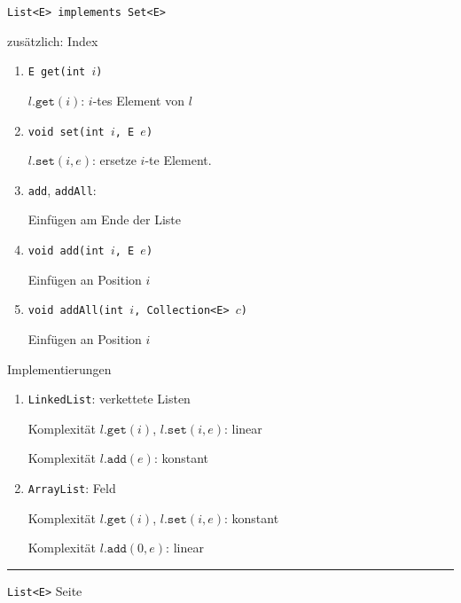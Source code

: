 \documentclass{slides}
\newcounter{mypage}
\begin{document}
\begin{slide}{}
\normalsize

\begin{center}
\texttt{List<E> implements Set<E>}
\end{center}

\footnotesize
zus\"atzlich: Index
\begin{enumerate}
\item \texttt{E get(int $i$)}

      $l.\mathtt{get}(i)$: \quad $i$-tes Element von $l$
\item \texttt{void set(int $i$, E $e$)}      

      $l.\mathtt{set}(i, e)$: \quad ersetze $i$-te Element.
\item \texttt{add}, \texttt{addAll}: 

      Einf\"ugen am Ende der Liste
\item \texttt{void add(int $i$, E $e$)}

      Einf\"ugen an Position $i$ 
\item \texttt{void addAll(int $i$, Collection<E> $c$)}

      Einf\"ugen an Position $i$ 
\end{enumerate}

Implementierungen
\begin{enumerate}
\item \texttt{LinkedList}: \quad verkettete Listen

      Komplexit\"at $l.\mathtt{get}(i)$, $l.\mathtt{set}(i,e)$: \quad linear

      Komplexit\"at $l.\mathtt{add}(e)$: \hspace*{3.5cm} konstant
\item \texttt{ArrayList}: \quad Feld

      Komplexit\"at $l.\mathtt{get}(i)$, $l.\mathtt{set}(i,e)$: \quad konstant

      Komplexit\"at $l.\mathtt{add}(0,e)$: \hspace*{2.9cm} linear
\end{enumerate}

\vspace*{\fill}
\tiny \addtocounter{mypage}{1}
\rule{17cm}{1mm}
\texttt{List<E>} \hspace*{\fill} Seite 
\end{slide}


\end{document}
